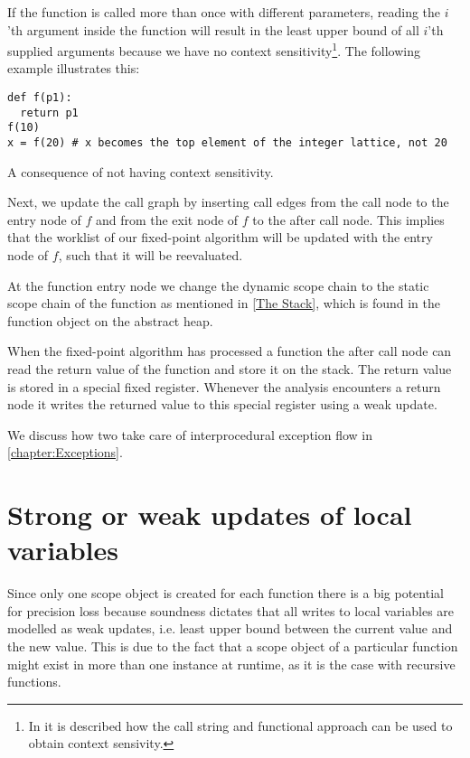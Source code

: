 If the function is called more than once with different parameters, reading the $i$'th argument inside the function will result in the least upper bound of all $i$'th supplied arguments because we have no context sensitivity\footnote{In \cite{sa} it is described how the call string and functional approach can be used to obtain context sensivity.}. The following example illustrates this:

\begin{listing}[H]
	\begin{verbatim}
def f(p1): 
  return p1
f(10)
x = f(20) # x becomes the top element of the integer lattice, not 20
	\end{verbatim}
\caption{A consequence of not having context sensitivity.}
\end{listing}

Next, we update the call graph by inserting call edges from the call node to the entry node of $f$ and from the exit node of $f$ to the after call node. This implies that the worklist of our fixed-point algorithm will be updated with the entry node of $f$, such that it will be reevaluated.

At the function entry node we change the dynamic scope chain to the static scope chain of the function as mentioned in \autoref{The Stack}, which is found in the function object on the abstract heap.

When the fixed-point algorithm has processed a function the after call node can read the return value of the function and store it on the stack. The return value is stored in a special fixed register. Whenever the analysis encounters a return node it writes the returned value to this special register using a weak update.

We discuss how two take care of interprocedural exception flow in \autoref{chapter:Exceptions}.

\section{Strong or weak updates of local variables}
\label{section:Strong or weak}
Since only one scope object is created for each function there is a big potential for precision loss because soundness dictates that all writes to local variables are modelled as weak updates, i.e. least upper bound between the current value and the new value. This is due to the fact that a scope object of a particular function might exist in more than one instance at runtime, as it is the case with recursive functions.

